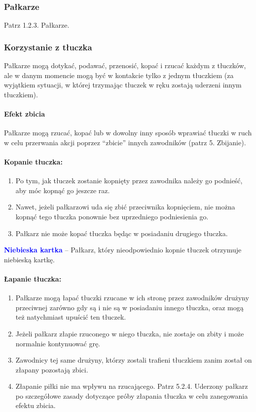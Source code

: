 \documentclass[12pt]{article}
\newcommand\bluecard[1]{\bgroup\textcolor{blue}{\textbf{#1}}}
\begin{document}
\subsubsection{Pałkarze}
Patrz 1.2.3. Pałkarze.

\subsubsection{Korzystanie z tłuczka}

Pałkarze mogą dotykać, podawać, przenosić, kopać i rzucać każdym z
tłuczków, ale w danym momencie mogą być w kontakcie tylko z jednym
tłuczkiem (za wyjątkiem sytuacji, w której trzymając tłuczek w ręku
zostają uderzeni innym tłuczkiem).

\paragraph{Efekt zbicia}
Pałkarze mogą rzucać, kopać lub w
dowolny inny sposób wprawiać tłuczki w ruch w celu przerwania akcji
poprzez ``zbicie'' innych zawodników (patrz 5. Zbijanie).

\paragraph{Kopanie tłuczka:}

\begin{enumerate}
	\item
	      Po tym, jak tłuczek zostanie kopnięty przez zawodnika należy go
	      podnieść, aby móc kopnąć go jeszcze raz.
	\item
	      Nawet, jeżeli pałkarzowi uda się zbić przeciwnika kopnięciem, nie
	      można kopnąć tego tłuczka ponownie bez uprzedniego podniesienia go.
	\item
	      Pałkarz nie może kopać tłuczka będąc w posiadaniu drugiego tłuczka.
\end{enumerate}

\bluecard{Niebieska kartka} -- Pałkarz, który nieodpowiednio kopnie tłuczek
otrzymuje niebieską kartkę.

\paragraph{Łapanie tłuczka:}

\begin{enumerate}
	\item
	      Pałkarze mogą łapać tłuczki rzucane w ich stronę przez zawodników
	      drużyny przeciwnej zarówno gdy są i nie są w posiadaniu innego
	      tłuczka, oraz mogą też natychmiast upuścić ten tłuczek.
	\item
	      Jeżeli pałkarz złapie rzuconego w niego tłuczka, nie zostaje on zbity
	      i może normalnie kontynuować grę.
	\item
	      Zawodnicy tej same drużyny, którzy zostali trafieni tłuczkiem zanim
	      został on złapany pozostają zbici.
	\item
	      Złapanie piłki nie ma wpływu na rzucającego. Patrz 5.2.4. Uderzony
	      pałkarz po szczegółowe zasady dotyczące próby złapania tłuczka w celu
	      zanegowania efektu zbicia.
\end{enumerate}
\end{document}
